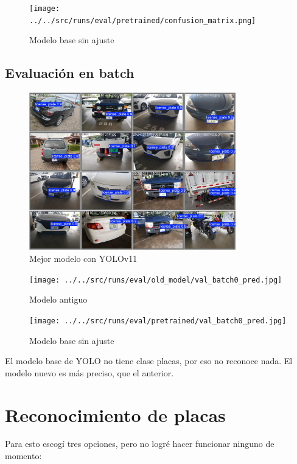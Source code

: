 \documentclass[12pt,a4paper]{article}
\begin{document}
\begin{figure}[H]
	\centering
	\texttt{[image: ../../src/runs/eval/pretrained/confusion\_matrix.png]}
	\caption{Modelo base sin ajuste}
\end{figure}

\subsection{Evaluación en batch}

\begin{figure}[H]
	\centering
	\includegraphics[width=0.8\textwidth]{../cap1/fig/proy/ejemplo-deteccion-placas.jpg}
	\caption{Mejor modelo con YOLOv11}
\end{figure}

\begin{figure}[H]
	\centering
	\texttt{[image: ../../src/runs/eval/old\_model/val\_batch0\_pred.jpg]}
	\caption{Modelo antiguo}
\end{figure}

\begin{figure}[H]
	\centering
	\texttt{[image: ../../src/runs/eval/pretrained/val\_batch0\_pred.jpg]}
	\caption{Modelo base sin ajuste}
\end{figure}

El modelo base de YOLO no tiene clase placas, por eso no reconoce nada.
El modelo nuevo es más preciso, que el anterior.

\section{Reconocimiento de placas}
Para esto escogí tres opciones, pero no logré hacer funcionar ninguno de momento:
\end{document}
